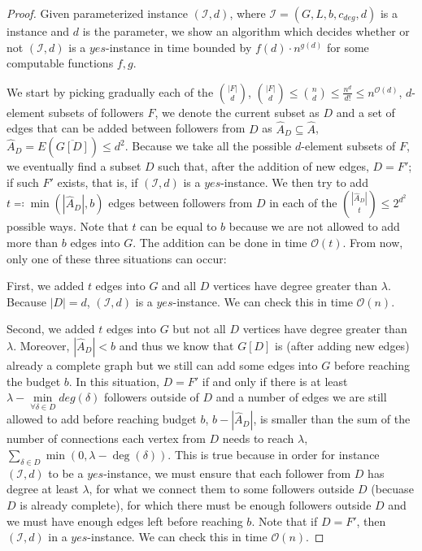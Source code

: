 \begin{proof}\label{proof:XPd}
    Given parameterized instance $(\mathcal{I}, d)$, where $\mathcal{I} = (G, L, b, c_{deg}, d)$ is a \HLdeg instance and $d$ is the parameter,
    we show an algorithm which decides whether or not $(\mathcal{I}, d)$ is a $yes$-instance in time bounded by
    $f(d) \cdot n^{g(d)}$ for some computable functions $f,g$.

    We start by picking gradually each of the $\binom{|F|}{d}$,
    $\binom{|F|}{d} \leq \binom{n}{d} \leq \frac{n^{d}}{d!} \leq n^{\mathcal{O}(d)}$,
    $d$-element subsets of followers $F$,
    we denote the current subset as $D$ and a set of edges that can be added between followers from $D$
    as $\hat{A}_D \subseteq \hat{A}$, $\hat{A}_D = E(\overline{G[D]}) \leq d^2$.
    Because we take all the possible $d$-element subsets of $F$, we eventually find a subset $D$ such that,
    after the addition of new edges, $D = F'$;
    if such $F'$ exists, that is, if $(\mathcal{I}, d)$ is a $yes$-instance.
    We then try to add $t \eqqcolon \min(|\hat{A}_D|, b)$ edges between followers from $D$
    in each of the $\binom{|\hat{A}_D|}{t} \leq 2^{d^2}$ possible ways.
    Note that $t$ can be equal to $b$ because we are not allowed to add more than $b$ edges into $G$.
    The addition can be done in time $\mathcal{O}(t)$.
    From now, only one of these three situations can occur:

    First, we added $t$ edges into $G$ and all $D$ vertices have degree greater than $\lambda$.
    Because $|D| = d$, $(\mathcal{I}, d)$ is a $yes$-instance.
    We can check this in time $\mathcal{O}(n)$.
    
    Second, we added $t$ edges into $G$ but not all $D$ vertices have degree greater than $\lambda$.
    Moreover, $|\hat{A}_D| < b$ and thus we know that $G[D]$ is (after adding new edges) already a complete graph
    but we still can add some edges into $G$ before reaching the budget $b$. 
    In this situation, $D = F'$ if and only if there is at least $\lambda - \min\limits_{\forall \delta \in D}deg(\delta)$ followers
    outside of $D$ and a number of edges we are still allowed to add before reaching budget $b$, $b - |\hat{A}_D|$,
    is smaller than the sum of the number of connections each vertex from $D$ needs to reach $\lambda$,
    $\sum_{\delta \in D} \min(0, \lambda - \deg(\delta))$.
    This is true because in order for instance $(\mathcal{I}, d)$ to be a $yes$-instance, we must
    ensure that each follower from $D$ has degree at least $\lambda$, for what we connect them to some followers
    outside $D$ (becuase $D$ is already complete), for which there must be enough followers outside $D$ and
    we must have enough edges left before reaching $b$.
    Note that if $D = F'$, then $(\mathcal{I}, d)$ in a $yes$-instance.
    We can check this in time $\mathcal{O}(n)$.
    

\end{proof}
